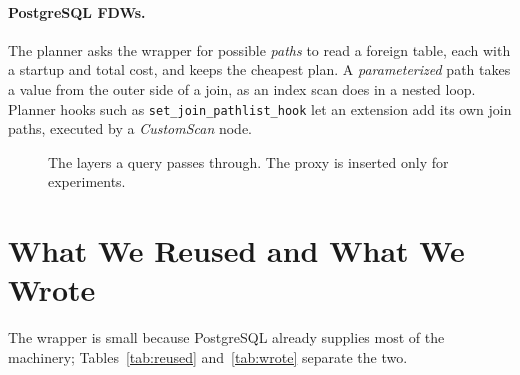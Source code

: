 \documentclass[11pt,a4paper]{article}
\newcommand{\code}[1]{\texttt{#1}}
\begin{document}
\paragraph{PostgreSQL FDWs.} The planner asks the wrapper for possible \emph{paths} to read a foreign table, each with a startup and total cost, and keeps the cheapest plan. A \emph{parameterized} path takes a value from the outer side of a join, as an index scan does in a nested loop. Planner hooks such as \code{set\_join\_pathlist\_hook} let an extension add its own join paths, executed by a \emph{CustomScan} node.

\begin{figure}[htbp]
\centering
{}
\caption{The layers a query passes through. The proxy is inserted only for experiments.}
\label{fig:arch}
\end{figure}

\section{What We Reused and What We Wrote}
\label{sec:parts}
The wrapper is small because PostgreSQL already supplies most of the machinery; Tables~\ref{tab:reused} and~\ref{tab:wrote} separate the two.
\end{document}
